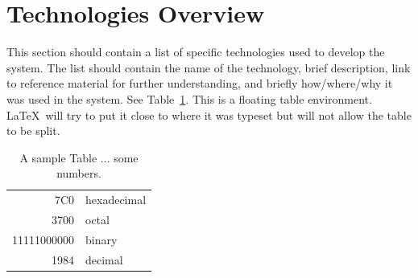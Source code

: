 \section{Technologies Overview}
This section should contain a list of specific technologies used to
develop the system.  The list should contain the name of the
technology, brief description, link to reference material for further
understanding, and briefly how/where/why it was used in the system.
See Table~\ref{somenumbers}.  This is a floating table environment.
\LaTeX\ will try to put it close to where it was typeset but will not
allow the table to be split.

\begin{table}[tbh]
\caption{A sample Table ... some numbers. \label{somenumbers}}
\begin{center}
\begin{tabular}{|r|l|}
  \hline
  7C0 & hexadecimal \\
  3700 & octal \\ \cline{2-2}
  11111000000 & binary \\
  \hline \hline
  1984 & decimal \\
  \hline
\end{tabular}
\end{center}
\end{table}


